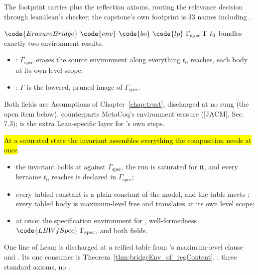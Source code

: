 \begin{remark}
 The footprint carries  plus the reflection axioms, routing the relevance
decision through lean4lean's checker; the capstone's own footprint is 33 names including
.
\end{remark}
\begin{definition}
\label{def:ErasureBridge}
\leanok
{}
$\code{ErasureBridge}\ \code{env}\ \code{bo}\ \code{lp}\ \Gamma_{\mathrm{spec}}\ \Gamma\ t_0$ bundles
exactly two environment results.
\begin{itemize}
\item {}: $\Gamma_{\mathrm{spec}}$ erases the source environment along everything $t_0$
reaches, each body at its own level scope;
\item {}: $\Gamma$ is the lowered, pruned image of $\Gamma_{\mathrm{spec}}$.
\end{itemize}
\end{definition}
\begin{remark}
 Both fields are Assumptions of Chapter~\ref{chap:trust}, discharged at no rung (the open
item below).
  counterparts MetaCoq's environment erasure ([JACM], Sec. 7.3); \LowerEnv{} is
the extra Lean-specific layer for \Lower{}'s own steps.
\end{remark}
\begin{theorem}
\label{thm:bridgeEnv_of_regInv}
\leanok
{}
 \hl{At a saturated state the invariant assembles everything the composition needs at
once}.
\begin{itemize}
\item {} the invariant holds at  against $\Gamma_{\mathrm{spec}}$, the run is
saturated for it, and every kername $t_0$ reaches is declared in $\Gamma_{\mathrm{spec}}$;
\item every tabled constant is a plain constant of the model, and the table meets
: every tabled body is maximum-level free and translates at its own level scope;
\item {} at once: the specification environment for , well-formedness
$\code{LBWfSpec}\ \Gamma_{\mathrm{spec}}$, and both  fields.
\end{itemize}
 One line of Lean;  is discharged at a reified table from
's maximum-level clause and . Its one consumer is
Theorem~\ref{thm:bridgeEnv_of_regContent}.
 \stProved{}; three standard axioms, no .
\end{theorem}
